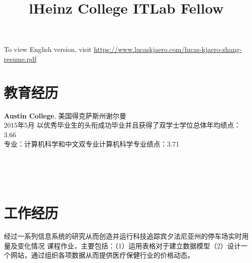 \documentclass[margin]{res}
\begin{document}
\begin{resume}


\section{}
To view English version, visit \href{https://www.lucaskjaerozhang.com/lucas-kjaero-zhang-resume.pdf}{https://www.lucaskjaero.com/lucas-kjaero-zhang-resume.pdf}

\section{教育经历}
\textbf{Austin College}, 美国得克萨斯州谢尔曼\\
2015年5月 以优秀毕业生的头衔成功毕业并且获得了双学士学位\hfill 总体年均绩点：
3.66\\
专业：计算机科学和中文双专业\hfill 计算机科学专业绩点：3.71

\begin{format}
\title{l}\\
\\
\body\\
\end{format}

\section{工作经历}
\title{\textbf{Heinz College ITLab Fellow}}
\begin{position}
经过一系列信息系统的研究从而创造并运行科技追踪宾夕法尼亚州的停车场实时用量及变化情况
课程作业，主要包括：（1）运用表格对于建立数据模型（2）设计一个网站，通过组织各项数据从而提供医疗保健行业的价格动态。
\end{position}


\end{resume}
\end{document}
